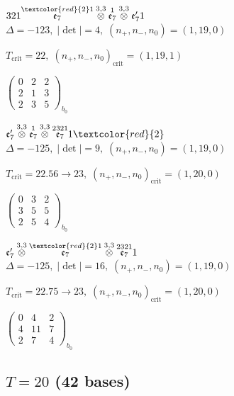 \documentclass[10pt]{article}
\begin{document}
$321\overset{\textcolor{red}{2}1}{\mathfrak{e}_7}\overset{3,3}{\otimes}\overset{1}{\mathfrak{e}_7}\overset{3,3}{\otimes}\mathfrak{e}_7'1$ \quad $\Delta=-123,\; |\det|=4,\; (n_+,n_-,n_0)=(1,19,0)$

\hspace{1em}$T_{\text{crit}}=22,\; (n_+,n_-,n_0)_{\text{crit}}=(1,19,1)$

\hspace{2em}$\left(\begin{smallmatrix}0 & 2 & 2 \\ 2 & 1 & 3 \\ 2 & 3 & 5\end{smallmatrix}\right)_{\!b_0}$

\smallskip

$\mathfrak{e}_7'\overset{3,3}{\otimes}\overset{1}{\mathfrak{e}_7}\overset{3,3}{\otimes}\overset{2321}{\mathfrak{e}_7}1\textcolor{red}{2}$ \quad $\Delta=-125,\; |\det|=9,\; (n_+,n_-,n_0)=(1,19,0)$

\hspace{1em}$T_{\text{crit}}=22.56 \to 23,\; (n_+,n_-,n_0)_{\text{crit}}=(1,20,0)$

\hspace{2em}$\left(\begin{smallmatrix}0 & 3 & 2 \\ 3 & 5 & 5 \\ 2 & 5 & 4\end{smallmatrix}\right)_{\!b_0}$

$\mathfrak{e}_7'\overset{3,3}{\otimes}\overset{\textcolor{red}{2}1}{\mathfrak{e}_7}\overset{3,3}{\otimes}\overset{2321}{\mathfrak{e}_7}1$ \quad $\Delta=-125,\; |\det|=16,\; (n_+,n_-,n_0)=(1,19,0)$

\hspace{1em}$T_{\text{crit}}=22.75 \to 23,\; (n_+,n_-,n_0)_{\text{crit}}=(1,20,0)$

\hspace{2em}$\left(\begin{smallmatrix}0 & 4 & 2 \\ 4 & 11 & 7 \\ 2 & 7 & 4\end{smallmatrix}\right)_{\!b_0}$


\subsection*{$T = 20$ \quad (42 bases)}
\smallskip
\end{document}
